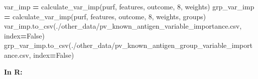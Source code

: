\documentclass[
  11pt,
  oneside]{book}
\newenvironment{Shaded}{\begin{snugshade}}{\end{snugshade}}
\newcommand{\DecValTok}[1]{\textcolor[rgb]{0.00,0.00,0.81}{#1}}
\newcommand{\NormalTok}[1]{#1}
\newcommand{\OperatorTok}[1]{\textcolor[rgb]{0.81,0.36,0.00}{\textbf{#1}}}
\newcommand{\StringTok}[1]{\textcolor[rgb]{0.31,0.60,0.02}{#1}}
\newcommand{\VariableTok}[1]{\textcolor[rgb]{0.00,0.00,0.00}{#1}}
\begin{document}
\begin{Shaded}
\begin{Highlighting}[]
\NormalTok{var\_imp }\OperatorTok{=}\NormalTok{ calculate\_var\_imp(purf, features, outcome, }\DecValTok{8}\NormalTok{, weights)}
\NormalTok{grp\_var\_imp }\OperatorTok{=}\NormalTok{ calculate\_var\_imp(purf, features, outcome, }\DecValTok{8}\NormalTok{, weights, groups)}
\NormalTok{var\_imp.to\_csv(}\StringTok{\textquotesingle{}./other\_data/pv\_known\_antigen\_variable\_importance.csv\textquotesingle{}}\NormalTok{, index}\OperatorTok{=}\VariableTok{False}\NormalTok{)}
\NormalTok{grp\_var\_imp.to\_csv(}\StringTok{\textquotesingle{}./other\_data/pv\_known\_antigen\_group\_variable\_importance.csv\textquotesingle{}}\NormalTok{, index}\OperatorTok{=}\VariableTok{False}\NormalTok{)}
\end{Highlighting}
\end{Shaded}

\textbf{In R: }
\end{document}
